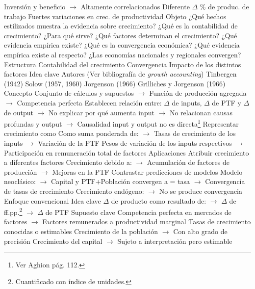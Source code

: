 \documentclass{nuevotema}
\begin{document}
\begin{esquemal}
				\4[] Inversión y beneficio
				\4[] $\to$ Altamente correlacionados
				\4[VI] Diferente $\Delta$ \% de produc. de trabajo
				\4[] Fuertes variaciones en crec. de productividad
		\2 Objeto
			\3 ¿Qué hechos estilizados muestra la evidencia sobre crecimiento?
			\3 ¿Qué es la contabilidad de crecimiento?
			\3 ¿Para qué sirve?
			\3 ¿Qué factores determinan el crecimiento?
			\3 ¿Qué evidencia empírica existe?
			\3 ¿Qué es la convergencia económica?
			\3 ¿Qué evidencia empírica existe al respecto?
			\3 ¿Las economías nacionales y regionales convergen?
		\2 Estructura
			\3 Contabilidad del crecimiento
			\3 Convergencia
			\3 Impacto de los distintos factores
	\1 
		\2 Idea clave
			\3 Autores
				\4[] (Ver bibliografía de \textit{growth accounting})
				\4 Tinbergen (1942)
				\4 Solow (1957, 1960)
				\4 Jorgenson (1966)
				\4 Grilliches y Jorgenson (1966)
			\3 Concepto
				\4 Conjunto de cálculos y supuestos
				\4[] $\to$ Función de producción agregada
				\4[] $\to$ Competencia perfecta
				\4 Establecen relación entre:
				\4[] $\Delta$ de inputs, $\Delta$ de PTF y $\Delta$ de output
				\4[] $\to$ No explicar por qué aumenta input
				\4[] $\to$ No relacionan causas profundas y output
				\4[] $\to$ Causalidad input y output no es directa\footnote{Ver Aghion pág. 112.}
				\4 Representar crecimiento como
				\4[] Como suma ponderada de:
				\4[] $\to$ Tasas de crecimiento de los inputs
				\4[] $\to$ Variación de la PTF
				\4[] Pesos de variación de los inputs respectivos
				\4[] $\to$ Participación en remuneración total de factores
			\3 Aplicaciones
				\4 Atribuir crecimiento a diferentes factores
				\4[] Crecimiento debido a:
				\4[] $\to$ Acumulación de factores de producción
				\4[] $\to$ Mejoras en la PTF
				\4 Contrastar predicciones de modelos
				\4[] Modelo neoclásico:
				\4[] $\to$ Capital y PTF+Población convergen a = tasa
				\4[] $\to$ Convergencia de tasas de crecimiento
				\4[] Crecimiento endógeno:
				\4[] $\to$ No se produce convergencia
		\2 Enfoque convencional
			\3 Idea clave
				\4 $\Delta$ de producto como resultado de:
				\4[] $\to$ $\Delta$ de ff.pp.\footnote{Cuantificado con índice de unidades.}
				\4[] $\to$ $\Delta$ de PTF
				\4 Supuesto clave
				\4[] Competencia perfecta en mercados de factores
				\4[] $\to$ Factores remunerados a productividad marginal
				\4 Tasas de crecimiento conocidas o estimables
				\4[] Crecimiento de la población
				\4[] $\to$ Con alto grado de precisión
				\4[] Crecimiento del capital
				\4[] $\to$ Sujeto a interpretación pero estimable

\end{esquemal}
\end{document}
